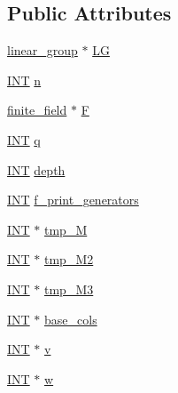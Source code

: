 \subsection*{Public Attributes}
\begin{DoxyCompactItemize}
\item 
\mbox{\hyperlink{classlinear__group}{linear\+\_\+group}} $\ast$ \mbox{\hyperlink{classsubspace__orbits_a4bb40dcf4638d7d27da887b19685beea}{LG}}
\item 
\mbox{\hyperlink{galois_8h_a09fddde158a3a20bd2dcadb609de11dc}{I\+NT}} \mbox{\hyperlink{classsubspace__orbits_ac20cac172fe91f97866b180ff5f7f5ee}{n}}
\item 
\mbox{\hyperlink{classfinite__field}{finite\+\_\+field}} $\ast$ \mbox{\hyperlink{classsubspace__orbits_a940d78e294f15939ace21aa00a460817}{F}}
\item 
\mbox{\hyperlink{galois_8h_a09fddde158a3a20bd2dcadb609de11dc}{I\+NT}} \mbox{\hyperlink{classsubspace__orbits_a0a562f066b509b6ea2cfd9e09ac9d22f}{q}}
\item 
\mbox{\hyperlink{galois_8h_a09fddde158a3a20bd2dcadb609de11dc}{I\+NT}} \mbox{\hyperlink{classsubspace__orbits_a956f599626b814169a93e8a8d9d05951}{depth}}
\item 
\mbox{\hyperlink{galois_8h_a09fddde158a3a20bd2dcadb609de11dc}{I\+NT}} \mbox{\hyperlink{classsubspace__orbits_a015c2baf4fbf9ae637db531953e56828}{f\+\_\+print\+\_\+generators}}
\item 
\mbox{\hyperlink{galois_8h_a09fddde158a3a20bd2dcadb609de11dc}{I\+NT}} $\ast$ \mbox{\hyperlink{classsubspace__orbits_a582867f083c6db29109bf4f538b8a472}{tmp\+\_\+M}}
\item 
\mbox{\hyperlink{galois_8h_a09fddde158a3a20bd2dcadb609de11dc}{I\+NT}} $\ast$ \mbox{\hyperlink{classsubspace__orbits_a0f051f935712ee7986b0639f17c7e761}{tmp\+\_\+\+M2}}
\item 
\mbox{\hyperlink{galois_8h_a09fddde158a3a20bd2dcadb609de11dc}{I\+NT}} $\ast$ \mbox{\hyperlink{classsubspace__orbits_a3cd7a59e998d0d076578fd751494067e}{tmp\+\_\+\+M3}}
\item 
\mbox{\hyperlink{galois_8h_a09fddde158a3a20bd2dcadb609de11dc}{I\+NT}} $\ast$ \mbox{\hyperlink{classsubspace__orbits_a64e1c9019d8dcf39f16528038aebb31a}{base\+\_\+cols}}
\item 
\mbox{\hyperlink{galois_8h_a09fddde158a3a20bd2dcadb609de11dc}{I\+NT}} $\ast$ \mbox{\hyperlink{classsubspace__orbits_a1f790f3b9504f0924185e3407814ff89}{v}}
\item 
\mbox{\hyperlink{galois_8h_a09fddde158a3a20bd2dcadb609de11dc}{I\+NT}} $\ast$ \mbox{\hyperlink{classsubspace__orbits_a9686ea4704791e10bc3672bd2df5e8a3}{w}}

\end{DoxyCompactItemize}
